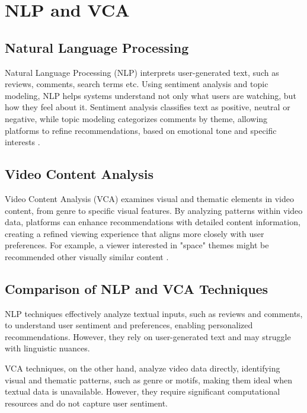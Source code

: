 \documentclass[12pt, english, a4paper]{article}
\begin{document}
\section{NLP and VCA}

\subsection{Natural Language Processing}

\hspace*{2em}Natural Language Processing (NLP) interprets user-generated text, such as reviews, comments, search terms etc. Using sentiment analysis and topic modeling, NLP helps systems understand not only what users are watching, but how they feel about it. Sentiment analysis classifies text as positive, neutral or negative, while topic modeling categorizes comments by theme, allowing platforms to refine recommendations, based on emotional tone and specific interests \cite{Hande2023, Saini202312347}.

\subsection{Video Content Analysis}

\hspace*{2em}Video Content Analysis (VCA) examines visual and thematic elements in video content, from genre to specific visual features. By analyzing patterns within video data, platforms can enhance recommendations with detailed content information, creating a refined viewing experience that aligns more closely with user preferences. For example, a viewer interested in "space" themes might be recommended other visually similar content \cite{Souane2023, Saini202312347}.

\subsection{Comparison of NLP and VCA Techniques}

\hspace*{2em}NLP techniques effectively analyze textual inputs, such as reviews and comments, to understand user sentiment and preferences, enabling personalized recommendations. However, they rely on user-generated text and may struggle with linguistic nuances.

VCA techniques, on the other hand, analyze video data directly, identifying visual and thematic patterns, such as genre or motifs, making them ideal when textual data is unavailable. However, they require significant computational resources and do not capture user sentiment.
\end{document}
